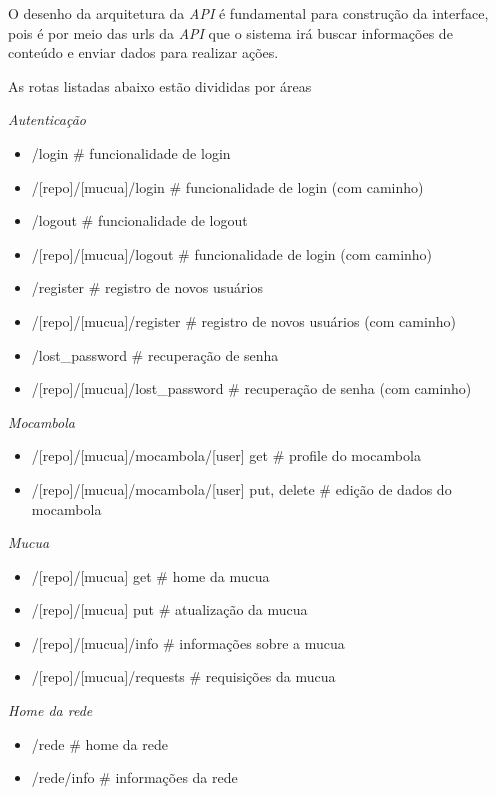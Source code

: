 \begin{itemize}
O desenho da arquitetura da \emph{API} é fundamental para construção
da interface, pois é por meio das urls da \emph{API} que o sistema
irá buscar informações de conteúdo e enviar dados para realizar ações.

As rotas listadas abaixo estão divididas por áreas

\emph{Autenticação}
\begin{itemize}
\item /login                    # funcionalidade de login
\item /[repo]/[mucua]/login     # funcionalidade de login (com caminho)
\item /logout                   # funcionalidade de logout
\item /[repo]/[mucua]/logout    # funcionalidade de login (com caminho)
\item /register                 # registro de novos usuários
\item /[repo]/[mucua]/register  # registro de novos usuários (com caminho)
\item /lost_password            # recuperação de senha
\item /[repo]/[mucua]/lost_password   # recuperação de senha (com caminho) 
\end{itemize}

\emph{Mocambola}
\begin{itemize}
\item /[repo]/[mucua]/mocambola/[user] {get}          # profile do mocambola
\item /[repo]/[mucua]/mocambola/[user] {put, delete}  # edição de dados do mocambola
\end{itemize}

\emph{Mucua}
\begin{itemize}
\item /[repo]/[mucua] {get}         # home da mucua
\item /[repo]/[mucua] {put}         # atualização da mucua
\item /[repo]/[mucua]/info          # informações sobre a mucua
\item /[repo]/[mucua]/requests      # requisições da mucua
\end{itemize}

\emph{Home da rede}
\begin{itemize}                
\item /rede                         # home da rede
\item /rede/info                    # informações da rede
\end{itemize}


\end{itemize}
